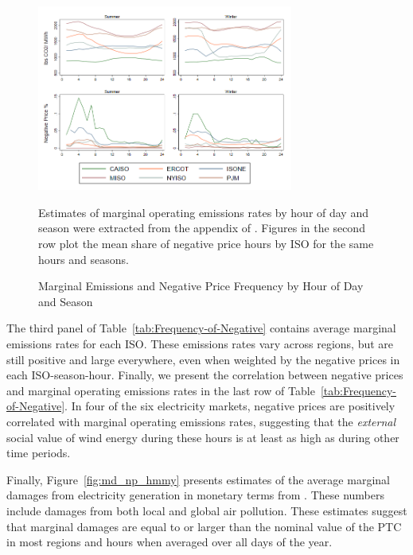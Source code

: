\documentclass[12pt]{article}
\begin{document}
\begin{figure}[H]
\caption{Marginal Emissions and Negative Price Frequency by Hour of Day and Season \label{fig:moer_np_season}}
\vspace{-25pt}
\begin{center}
\includegraphics[width=0.75\textwidth]{moer_np_season.png}
\end{center}
\vspace{-15pt}
\footnotesize
Estimates of marginal operating emissions rates by hour of day and season were extracted from the appendix of \citet{callaway_location_2018}. Figures in the second row plot the mean share of negative price hours by ISO for the same hours and seasons. %
\end{figure}


The third panel of Table~\ref{tab:Frequency-of-Negative} contains average marginal emissions rates for each ISO. These emissions rates vary across regions, but are still positive and large everywhere, even when weighted by the negative prices in each ISO-season-hour. Finally, we present the correlation between negative prices and marginal operating emissions rates in the last row of Table~\ref{tab:Frequency-of-Negative}. In four of the six electricity markets, negative prices are positively correlated with marginal operating emissions rates, suggesting that the \textit{external} social value of wind energy during these hours is at least as high as during other time periods.

Finally, Figure~\ref{fig:md_np_hmmy} presents estimates of the average marginal damages from electricity generation in monetary terms from \cite{holland_are_2016}. These numbers include damages from both local and global air pollution. These estimates suggest that marginal damages are equal to or larger than the nominal value of the PTC in most regions and hours when averaged over all days of the year.
\end{document}
